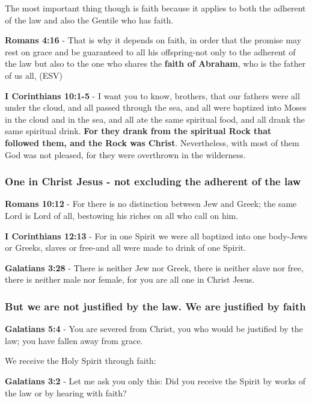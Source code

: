 \documentclass[11pt]{article}
\begin{document}
The most important thing though is faith because it applies to both the adherent of the law and also the Gentile who has faith.

\textbf{Romans 4:16} - That is why it depends on faith, in order that the promise may rest on grace and be guaranteed to all his offspring-not only to the adherent of the law but also to the one who shares the \textbf{faith of Abraham}, who is the father of us all, (ESV)

\textbf{I Corinthians 10:1-5} - I want you to know, brothers, that our fathers were all under the cloud, and all passed through the sea, and all were baptized into Moses in the cloud and in the sea, and all ate the same spiritual food, and all drank the same spiritual drink. \textbf{For they drank from the spiritual Rock that followed them, and the Rock was Christ}. Nevertheless, with most of them God was not pleased, for they were overthrown in the wilderness.

\subsubsection{One in Christ Jesus - not excluding the adherent of the law}
\label{sec:orge7b9d4a}

\textbf{Romans 10:12} - For there is no distinction between Jew and Greek; the same Lord is Lord of all, bestowing his riches on all who call on him.

\textbf{I Corinthians 12:13} - For in one Spirit we were all baptized into one body-Jews or Greeks, slaves or free-and all were made to drink of one Spirit.

\textbf{Galatians 3:28} - There is neither Jew nor Greek, there is neither slave nor free, there is neither male nor female, for you are all one in Christ Jesus.

\subsubsection{But we are not justified by the law. We are justified by faith}
\label{sec:org73c53f6}

\textbf{Galatians 5:4} - You are severed from Christ, you who would be justified by the law; you have fallen away from grace.

We receive the Holy Spirit through faith:

\textbf{Galatians 3:2} - Let me ask you only this: Did you receive the Spirit by works of the law or by hearing with faith?􄌹
\end{document}
